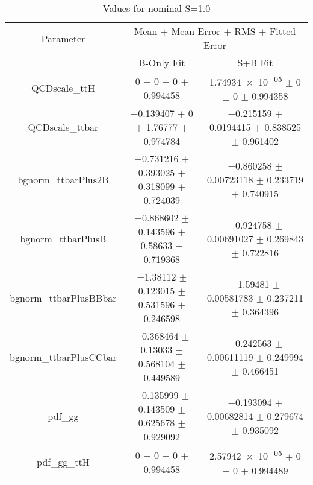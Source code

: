 \begin{table}
\centering
\caption{Values for nominal S=1.0}
\begin{tabular}{ccc}
\toprule
Parameter & \multicolumn{2}{c}{Mean $\pm$ Mean Error $\pm$ RMS $\pm$ Fitted Error}\\
 & B-Only Fit & S+B Fit\\
\midrule
QCDscale\_ttH & \num{0} $\pm$ \num{0} $\pm$ \num{0} $\pm$ \num{0.994458} & \num{1.74934e-05} $\pm$ \num{0} $\pm$ \num{0} $\pm$ \num{0.994358}\\
QCDscale\_ttbar & \num{-0.139407} $\pm$ \num{0} $\pm$ \num{1.76777} $\pm$ \num{0.974784} & \num{-0.215159} $\pm$ \num{0.0194415} $\pm$ \num{0.838525} $\pm$ \num{0.961402}\\
bgnorm\_ttbarPlus2B & \num{-0.731216} $\pm$ \num{0.393025} $\pm$ \num{0.318099} $\pm$ \num{0.724039} & \num{-0.860258} $\pm$ \num{0.00723118} $\pm$ \num{0.233719} $\pm$ \num{0.740915}\\
bgnorm\_ttbarPlusB & \num{-0.868602} $\pm$ \num{0.143596} $\pm$ \num{0.58633} $\pm$ \num{0.719368} & \num{-0.924758} $\pm$ \num{0.00691027} $\pm$ \num{0.269843} $\pm$ \num{0.722816}\\
bgnorm\_ttbarPlusBBbar & \num{-1.38112} $\pm$ \num{0.123015} $\pm$ \num{0.531596} $\pm$ \num{0.246598} & \num{-1.59481} $\pm$ \num{0.00581783} $\pm$ \num{0.237211} $\pm$ \num{0.364396}\\
bgnorm\_ttbarPlusCCbar & \num{-0.368464} $\pm$ \num{0.13033} $\pm$ \num{0.568104} $\pm$ \num{0.449589} & \num{-0.242563} $\pm$ \num{0.00611119} $\pm$ \num{0.249994} $\pm$ \num{0.466451}\\
pdf\_gg & \num{-0.135999} $\pm$ \num{0.143509} $\pm$ \num{0.625678} $\pm$ \num{0.929092} & \num{-0.193094} $\pm$ \num{0.00682814} $\pm$ \num{0.279674} $\pm$ \num{0.935092}\\
pdf\_gg\_ttH & \num{0} $\pm$ \num{0} $\pm$ \num{0} $\pm$ \num{0.994458} & \num{2.57942e-05} $\pm$ \num{0} $\pm$ \num{0} $\pm$ \num{0.994489}\\
\bottomrule
\end{tabular}
\end{table}